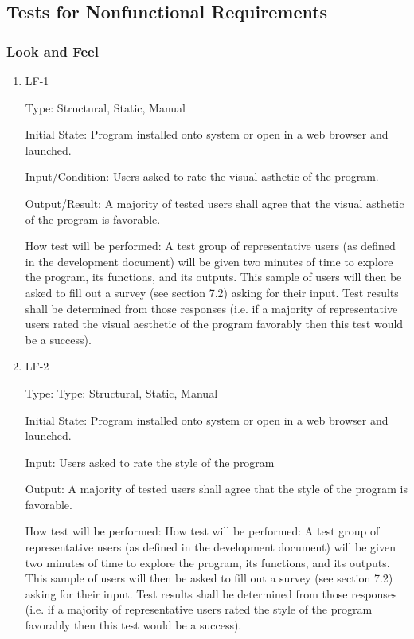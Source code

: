 \documentclass[12pt, titlepage]{article}
\begin{document}
\subsection{Tests for Nonfunctional Requirements}

\subsubsection{Look and Feel}

\begin{enumerate}

\item{LF-1\\}

Type: Structural, Static, Manual
					
Initial State: Program installed onto system or open in a web browser and launched.
					
Input/Condition: Users asked to rate the visual asthetic of the program.
					
Output/Result: A majority of tested users shall agree that the visual asthetic of the program is favorable.
					
How test will be performed: A test group of representative users (as defined in the development document) will be given two minutes of time to explore the program, its functions, and its outputs. This sample of users will then be asked to fill out a survey (see section 7.2) asking for their input. Test results shall be determined from those responses (i.e. if a majority of representative users rated the visual aesthetic of the program favorably then this test would be a success).
					
\item{LF-2\\}

Type: Type: Structural, Static, Manual
					
Initial State: Program installed onto system or open in a web browser and launched.
					
Input: Users asked to rate the style of the program
					
Output: A majority of tested users shall agree that the style of the program is favorable.
					
How test will be performed: How test will be performed: A test group of representative users (as defined in the development document) will be given two minutes of time to explore the program, its functions, and its outputs. This sample of users will then be asked to fill out a survey (see section 7.2) asking for their input. Test results shall be determined from those responses (i.e. if a majority of representative users rated the style of the program favorably then this test would be a success).

\end{enumerate}
\end{document}
